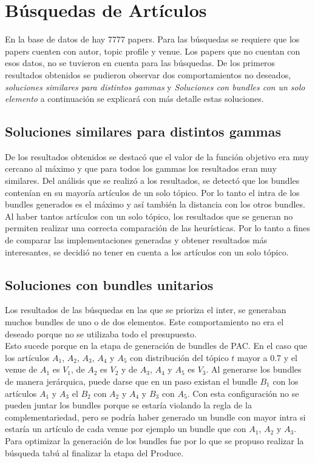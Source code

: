 \section{Búsquedas de Artículos}
En la base de datos de \cite{dataDrive} hay 7777 papers. Para las búsquedas se requiere que los papers cuenten con autor, topic profile y venue. Los papers que no cuentan con esos datos, no se tuvieron en cuenta para las búsquedas. De los primeros resultados obtenidos se pudieron observar dos comportamientos no deseados, \textit{soluciones similares para distintos gammas} y \textit{Soluciones con bundles con un solo elemento} a continuación se explicará con más detalle estas soluciones.
\subsection{Soluciones similares para distintos gammas}
De los resultados obtenidos se destacó que el valor de la función objetivo era muy cercano al máximo y que para todos los gammas los resultados eran muy similares. Del análisis que se realizó a los resultados, se detectó que los bundles contenían en su mayoría artículos de un solo tópico. Por lo tanto el intra de los bundles generados es el máximo y así también la distancia con los otros bundles.\\
Al haber tantos artículos con un solo tópico, los resultados que se generan no permiten realizar una correcta comparación de las heurísticas. Por lo tanto a fines de comparar las implementaciones generadas y obtener resultados más interesantes, se decidió no tener en cuenta a los artículos con un solo tópico.
\subsection{Soluciones con bundles unitarios}
Los resultados de las búsquedas en las que se prioriza el inter, se generaban muchos bundles de uno o de dos elementos. Este comportamiento no era el deseado porque no se utilizaba todo el presupuesto.\\
Esto sucede porque en la etapa de generación de bundles de PAC. En el caso que los artículos $A_1$, $A_2$, $A_3$, $A_4$ y $A_5$ con distribución del tópico $t$ mayor a 0.7 y el venue de $A_1$ es $V_1$, de $A_2$ es $V_2$ y de  $A_3$, $A_4$ y $A_5$ es $V_3$. Al generarse los bundles de manera jerárquica, puede darse que en un paso existan el bundle $B_1$ con los artículos $A_1$ y $A_3$ el $B_2$ con $A_2$ y $A_4$ y $B_3$ con $A_5$. Con esta configuración no se pueden juntar los bundles porque se estaría violando la regla de la complementariedad, pero se podría haber generado un bundle con mayor intra si estaría un artículo de cada venue por ejemplo un bundle que con $A_1$, $A_2$ y $A_3$. \\
Para optimizar la generación de los bundles fue por lo que se propuso realizar la búsqueda tabú al finalizar la etapa del Produce.
